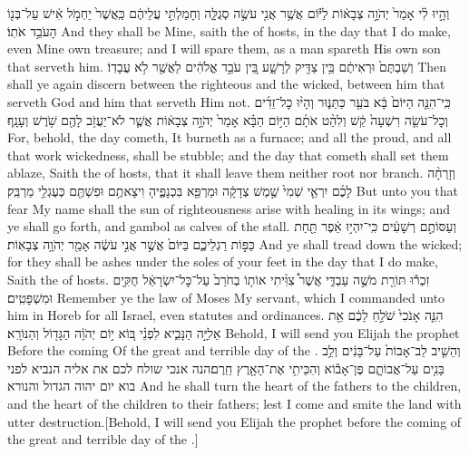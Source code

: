\documentclass[11pt, openany]{book}
\begin{document}
{וְהָ֣יוּ לִ֗י אָמַר֙ יְהֹוָ֣ה צְבָא֔וֹת לַיּ֕וֹם אֲשֶׁ֥ר אֲנִ֖י עֹשֶׂ֣ה סְגֻלָּ֑ה וְחָמַלְתִּ֣י עֲלֵיהֶ֔ם כַּֽאֲשֶׁר֙ יַחְמֹ֣ל אִ֔ישׁ עַל־בְּנ֖וֹ הָעֹבֵ֥ד אֹתֽוֹ׃}
{And they shall be Mine, saith the \lord\space of hosts, in the day that I do make, even Mine own treasure; and I will spare them, as a man spareth His own son that serveth him.}
{וְשַׁבְתֶּם֙ וּרְאִיתֶ֔ם בֵּ֥ין צַדִּ֖יק לְרָשָׁ֑ע בֵּ֚ין עֹבֵ֣ד אֱלֹהִ֔ים לַאֲשֶׁ֖ר לֹ֥א עֲבָדֽוֹ׃ \petucha }
{Then shall ye again discern between the righteous and the wicked, between him that serveth God and him that serveth Him not.}
{כִּֽי־הִנֵּ֤ה הַיּוֹם֙ בָּ֔א בֹּעֵ֖ר כַּתַּנּ֑וּר וְהָי֨וּ כׇל־זֵדִ֜ים וְכׇל־עֹשֵׂ֤ה רִשְׁעָה֙ קַ֔שׁ וְלִהַ֨ט אֹתָ֜ם הַיּ֣וֹם הַבָּ֗א אָמַר֙ יְהֹוָ֣ה צְבָא֔וֹת אֲשֶׁ֛ר לֹא־יַעֲזֹ֥ב לָהֶ֖ם שֹׁ֥רֶשׁ וְעָנָֽף׃}
{For, behold, the day cometh, It burneth as a furnace; and all the proud, and all that work wickedness, shall be stubble; and the day that cometh shall set them ablaze, Saith the \lord\space of hosts, that it shall leave them neither root nor branch.}
{וְזָרְחָ֨ה לָכֶ֜ם יִרְאֵ֤י שְׁמִי֙ שֶׁ֣מֶשׁ צְדָקָ֔ה וּמַרְפֵּ֖א בִּכְנָפֶ֑יהָ וִיצָאתֶ֥ם וּפִשְׁתֶּ֖ם כְּעֶגְלֵ֥י מַרְבֵּֽק׃}
{But unto you that fear My name shall the sun of righteousness arise with healing in its wings; and ye shall go forth, and gambol as calves of the stall.}
{וְעַסּוֹתֶ֣ם רְשָׁעִ֔ים כִּֽי־יִהְי֣וּ אֵ֔פֶר תַּ֖חַת כַּפּ֣וֹת רַגְלֵיכֶ֑ם בַּיּוֹם֙ אֲשֶׁ֣ר אֲנִ֣י עֹשֶׂ֔ה אָמַ֖ר יְהֹוָ֥ה צְבָאֽוֹת׃ \petucha }
{And ye shall tread down the wicked; for they shall be ashes under the soles of your feet in the day that I do make, Saith the \lord\space of hosts.}
{\large זִ\normalsize כְר֕וּ תּוֹרַ֖ת מֹשֶׁ֣ה עַבְדִּ֑י אֲשֶׁר֩ צִוִּ֨יתִי אוֹת֤וֹ בְחֹרֵב֙ עַל־כׇּל־יִשְׂרָאֵ֔ל חֻקִּ֖ים וּמִשְׁפָּטִֽים׃}
{Remember ye the law of Moses My servant, which I commanded unto him in Horeb for all Israel, even statutes and ordinances.}
{הִנֵּ֤ה אָנֹכִי֙ שֹׁלֵ֣חַ לָכֶ֔ם אֵ֖ת אֵלִיָּ֣ה הַנָּבִ֑יא לִפְנֵ֗י בּ֚וֹא י֣וֹם יְהֹוָ֔ה הַגָּד֖וֹל וְהַנּוֹרָֽא׃}
{Behold, I will send you Elijah the prophet Before the coming Of the great and terrible day of the \lord.}
{וְהֵשִׁ֤יב לֵב־אָבוֹת֙ עַל־בָּנִ֔ים וְלֵ֥ב בָּנִ֖ים עַל־אֲבוֹתָ֑ם פֶּן־אָב֕וֹא וְהִכֵּיתִ֥י אֶת־הָאָ֖רֶץ חֵֽרֶם׃\small הנה אנכי שולח לכם את אליה הנביא לפני בוא יום יהוה הגדול והנורא\normalsize }
{And he shall turn the heart of the fathers to the children, and the heart of the children to their fathers; lest I come and smite the land with utter destruction.\small [Behold, I will send you Elijah the prophet before the coming of the great and terrible day of the \lord.]\normalsize}
\end{document}
